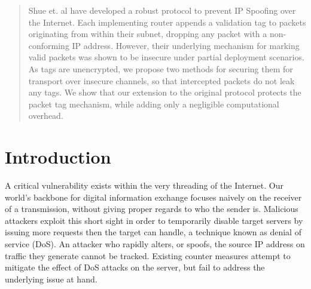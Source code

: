 \documentclass[12pt]{article} %
\begin{document}

\newpage %



\begin{abstract}
	Shue et. al have developed a robust protocol to prevent IP Spoofing over the Internet. Each implementing router appends a validation tag to packets originating from within their subnet, dropping any packet with a non-conforming IP address\cite{Shue20081567}. However, their underlying mechanism for marking valid packets was shown to be insecure under partial deployment scenarios. As tags are unencrypted, we propose two methods for securing them for transport over insecure channels, so that intercepted packets do not leak any tags. We show that our extension to the original protocol protects the packet tag mechanism, while adding only a negligible computational overhead.

\end{abstract}

\section{Introduction}

A critical vulnerability exists within the very threading of the Internet. Our world's backbone for digital information exchange focuses naively on the receiver of a transmission, without giving proper regards to who the sender is. Malicious attackers exploit this short sight in order to temporarily disable target servers by issuing more requests then the target can handle, a technique known as denial of service (DoS). An attacker who rapidly alters, or spoofs, the source IP address on traffic they generate cannot be tracked. Existing counter measures attempt to mitigate the effect of DoS attacks on the server, but fail to address the underlying issue at hand. 
\end{document}
